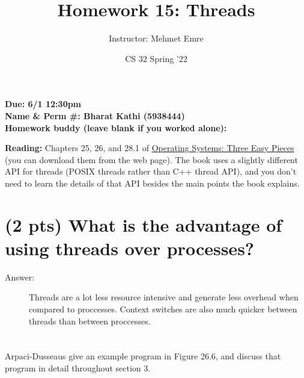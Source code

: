 \documentclass[11pt]{article}
\author{Instructor: Mehmet Emre}
\date{CS 32 Spring '22}
\title{Homework 15: Threads}
\begin{document}
\maketitle
\textbf{Due: 6/1 12:30pm} \\ 
\vspace{1em}
\textbf{Name \& Perm \#: Bharat Kathi (5938444)} \\ 
\textbf{Homework buddy (leave blank if you worked alone):}

\textbf{Reading:} Chapters 25, 26, and 28.1 of \href{https://pages.cs.wisc.edu/\~remzi/OSTEP/}{Operating Systems: Three Easy
Pieces} (you can download them from the web page). The book uses a slightly
different API for threads (POSIX threads rather than C++ thread API), and you
don't need to learn the details of that API besides the main points the book
explains.


\section{(2 pts) What is the advantage of using threads over processes?}
\label{sec:orgfcde0f0}

\begin{description}
    \item[Answer:] Threads are a lot less resource intensive and generate less overhead when compared to proccesses. Context switches are also much quicker between threads than between proccesses.
\end{description}

\section{}
\label{sec:orge3fa15a}
Arpaci-Dusseaus give an example program in Figure 26.6, and discuss that program
in detail throughout section 3.
\end{document}

